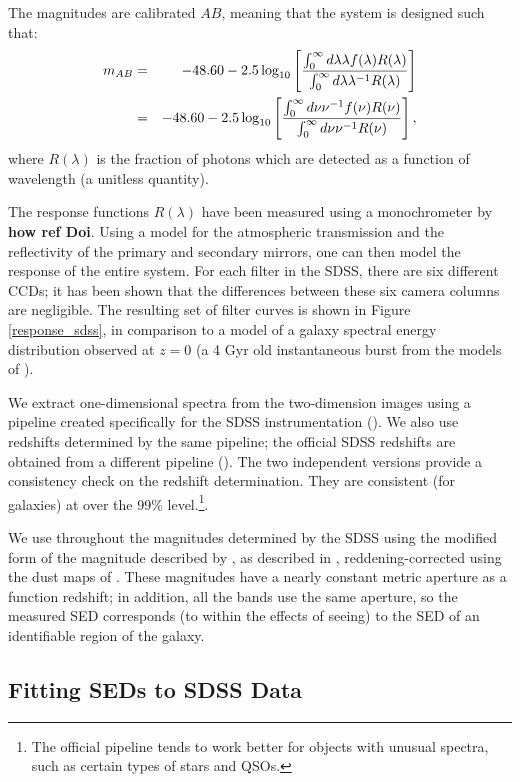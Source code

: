 \documentclass[10pt,preprint]{aastex}
\begin{document}
The magnitudes are calibrated $AB$, meaning that the system is
designed such that:
\begin{eqnarray}
m_{AB} &=& -48.60 - 2.5 \log_{10}\left[
\frac{\int_{0}^{\infty} d\lambda \lambda f(\lambda) R(\lambda)}
{\int_{0}^{\infty} d\lambda \lambda^{-1} R(\lambda)}\right]
\cr
&=& -48.60 - 2.5 \log_{10}\left[
\frac{\int_{0}^{\infty} d\nu \nu^{-1} f(\nu) R(\nu)}
{\int_{0}^{\infty} d\nu \nu^{-1} R(\nu)}\right],
\cr
\end{eqnarray}
where $R(\lambda)$ is the fraction of photons which are detected as a
function of wavelength (a unitless quantity). 

The response functions $R(\lambda)$ have been measured using a
monochrometer by {\bf how ref Doi}.  Using a model for the atmospheric
transmission and the reflectivity of the primary and secondary
mirrors, one can then model the response of the entire system. For
each filter in the SDSS, there are six different CCDs; it has been
shown that the differences between these six camera columns are
negligible. The resulting set of filter curves is shown in Figure
\ref{response_sdss}, in comparison to a model of a galaxy spectral
energy distribution observed at $z=0$ (a 4 Gyr old instantaneous burst
from the models of \citealt{bruzual93a}).

We extract one-dimensional spectra from the two-dimension images using
a pipeline created specifically for the SDSS instrumentation
(\citealt{schlegel02a}). We also use redshifts determined by the same
pipeline; the official SDSS redshifts are obtained from a different
pipeline (\citealt{subbarao02a}). The two independent versions provide
a consistency check on the redshift determination. They are consistent
(for galaxies) at over the 99\% level.\footnote{The official pipeline
tends to work better for objects with unusual spectra, such as certain
types of stars and QSOs.}.

We use throughout the magnitudes determined by the SDSS using the
modified form of the magnitude described by \citet{petrosian76a}, as
described in \citet{strauss02a}, reddening-corrected using the dust
maps of \citet{schlegel98a}. These magnitudes have a nearly constant
metric aperture as a function redshift; in addition, all the bands use
the same aperture, so the measured SED corresponds (to within the
effects of seeing) to the SED of an identifiable region of the galaxy.

\subsection{Fitting SEDs to SDSS Data}
\end{document}
